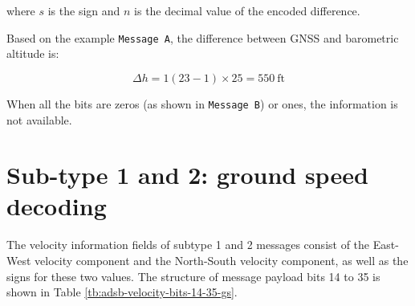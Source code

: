 where $s$ is the sign and $n$ is the decimal value of the encoded difference.

Based on the example \texttt{Message A}, the difference between GNSS and barometric altitude is:

\begin{equation}
  \Delta h = 1 (23 - 1) \times 25 = 550 ~\text{ft}
\end{equation}

When all the bits are zeros (as shown in \texttt{Message B}) or ones, the information is not available.


\section{Sub-type 1 and 2: ground speed decoding}

The velocity information fields of subtype 1 and 2 messages consist of the East-West velocity component and the North-South velocity component, as well as the signs for these two values. The structure of message payload bits 14 to 35 is shown in Table \ref{tb:adsb-velocity-bits-14-35-gs}.


